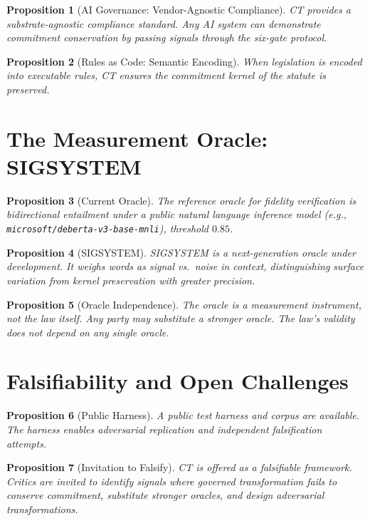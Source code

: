 \documentclass[11pt,a4paper]{article}
\newtheorem{proposition}{Proposition}[section]
\begin{document}
\begin{proposition}[AI Governance: Vendor-Agnostic Compliance]
CT provides a substrate-agnostic compliance standard. Any AI system can demonstrate commitment conservation by passing signals through the six-gate protocol.
\end{proposition}

\begin{proposition}[Rules as Code: Semantic Encoding]
When legislation is encoded into executable rules, CT ensures the commitment kernel of the statute is preserved.
\end{proposition}

\section{The Measurement Oracle: SIGSYSTEM}

\begin{proposition}[Current Oracle]
The reference oracle for fidelity verification is bidirectional entailment under a public natural language inference model (e.g., \texttt{microsoft/deberta-v3-base-mnli}), threshold $0.85$.
\end{proposition}

\begin{proposition}[SIGSYSTEM]
SIGSYSTEM is a next-generation oracle under development. It weighs words as signal vs.\ noise in context, distinguishing surface variation from kernel preservation with greater precision.
\end{proposition}

\begin{proposition}[Oracle Independence]
The oracle is a measurement instrument, not the law itself. Any party may substitute a stronger oracle. The law's validity does not depend on any single oracle.
\end{proposition}

\section{Falsifiability and Open Challenges}

\begin{proposition}[Public Harness]
A public test harness and corpus are available. The harness enables adversarial replication and independent falsification attempts.
\end{proposition}

\begin{proposition}[Invitation to Falsify]
CT is offered as a falsifiable framework. Critics are invited to identify signals where governed transformation fails to conserve commitment, substitute stronger oracles, and design adversarial transformations.
\end{proposition}
\end{document}
